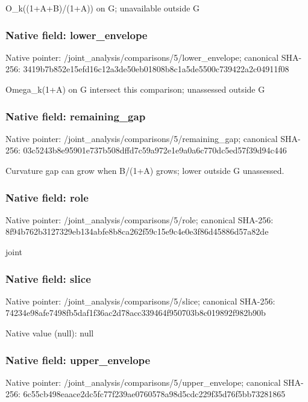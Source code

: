 \documentclass[10pt,a4paper]{article}
\begin{document}
\begingroup\raggedright\sloppy O\_\allowbreak{}k((1+A+B)/\allowbreak{}(1+A)) on G;\allowbreak{} unavailable outside G\par\endgroup

\subsubsection{Native field: lower\_\allowbreak{}envelope}
Native pointer: /joint\_\allowbreak{}analysis/comparisons/5/lower\_\allowbreak{}envelope; canonical SHA-256: 3419b7b852e15efd16c12a3de50eb01808b8c1a5de5500c739422a2c04911f08

\begingroup\raggedright\sloppy Omega\_\allowbreak{}k(1+A) on G intersect this comparison;\allowbreak{} unassessed outside G\par\endgroup

\subsubsection{Native field: remaining\_\allowbreak{}gap}
Native pointer: /joint\_\allowbreak{}analysis/comparisons/5/remaining\_\allowbreak{}gap; canonical SHA-256: 03c5243b8e95901e737b508dffd7c59a972e1e9a0a6c770dc5ed57f39d94c446

\begingroup\raggedright\sloppy Curvature gap can grow when B/\allowbreak{}(1+A) grows;\allowbreak{} lower outside G unassessed.\par\endgroup

\subsubsection{Native field: role}
Native pointer: /joint\_\allowbreak{}analysis/comparisons/5/role; canonical SHA-256: 8f94b762b3127329eb134abfe8b8ca262f59c15e9c4e0e3f86d45886d57a82de

\begingroup\raggedright\sloppy joint\par\endgroup

\subsubsection{Native field: slice}
Native pointer: /joint\_\allowbreak{}analysis/comparisons/5/slice; canonical SHA-256: 74234e98afe7498fb5daf1f36ac2d78acc339464f950703b8c019892f982b90b

Native value (null): null

\subsubsection{Native field: upper\_\allowbreak{}envelope}
Native pointer: /joint\_\allowbreak{}analysis/comparisons/5/upper\_\allowbreak{}envelope; canonical SHA-256: 6c55cb498eaace2dc5fc77f239ae0760578a98d5cdc229f35d76f5bb73281865
\end{document}
